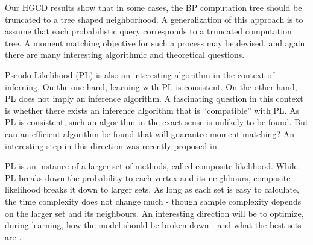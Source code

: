 Our HGCD results show that in some cases, the BP computation tree should be truncated to a tree shaped neighborhood. A generalization of this approach is to assume that each probabilistic query corresponds to a truncated computation tree. A moment matching objective for such a process may be devised, and again there are many interesting algorithmic and theoretical questions.  


Pseudo-Likelihood (PL) is also an interesting algorithm in the context of inferning. On the one hand, learning with PL is consistent. On the other hand, PL does not imply an inference algorithm. A fascinating question in this context is whether there exists an inference algorithm that is ``compatible'' with PL. As PL is consistent, such an algorithm in the exact sense is unlikely to be found.
But can an efficient algorithm be found that will guarantee moment matching? An interesting
step in this direction was recently proposed in \cite{bertasius2016local}.

PL is an instance of a larger set of methods, called composite likelihood. While PL breaks down the probability to each vertex and its neighbours, composite likelihood breaks it down to larger sets.
As long as each set is easy to calculate, the time complexity does not change much - though sample complexity depends on the larger set and its neighbours.
An interesting direction will be to optimize, during learning, how the model should be broken down - and what the best sets are \cite{dillon2010stochastic}.

